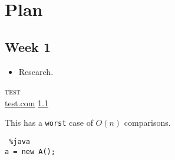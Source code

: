 \documentclass[a4paper,11pt]{article}
\begin{document}
\section{Plan}
	\subsection{Week 1}
	\label{week1}

	\begin{itemize}
	\item Research.
	\end{itemize}

	\textsc{\Large test}\\
	\url{test.com}
	\ref{week1}
	
This has a \texttt{worst} case of $O(n)$ comparisons. 
\begin{lstlisting} %java
a = new A();
\end{lstlisting}
\end{document}
